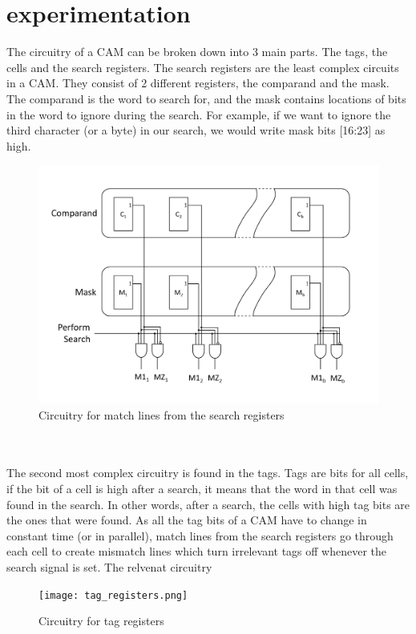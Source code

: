 \section{experimentation}
The circuitry of a CAM can be broken down into 3 main parts. The tags, the cells and the search registers. 
The search registers are the least complex circuits in a CAM. They consist of 2 different registers, the comparand and the mask. 
The comparand is the word to search for, and the mask contains locations of bits in the word to ignore during the search.
For example, if we want to ignore the third character (or a byte) in our search, we would write mask bits [16:23] as high.
\begin{figure}
    \includegraphics[width=1\columnwidth]{search_registers.png}
    \caption[Short text]{Circuitry for match lines from the search registers}
\end{figure}
\\\\
The second most complex circuitry is found in the tags.
Tags are bits for all cells, if the bit of a cell is high after a search, it means that the word in that cell was found in the search. 
In other words, after a search, the cells with high tag bits are the ones that were found. 
As all the tag bits of a CAM have to change in constant time (or in parallel), match lines from the search registers go through each cell to create mismatch lines which turn irrelevant tags off whenever the search signal is set.
The relvenat circuitry 
\begin{figure}
    \texttt{[image: tag\_registers.png]}
    \caption[Short text]{Circuitry for tag registers}
\end{figure}
